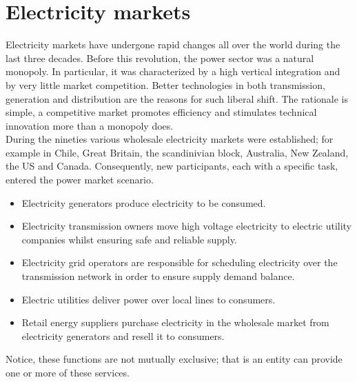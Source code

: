 \section{Electricity markets}
Electricity markets have undergone rapid changes all over the world during the last three decades.
Before this revolution, the power sector was a natural monopoly. In particular, it was characterized by a high vertical integration and by very little market competition. Better technologies in both transmission, generation and distribution are the reasons for such liberal shift. The rationale is simple, a competitive market promotes efficiency and stimulates technical innovation more than a monopoly does.
\\
During the nineties various wholesale electricity markets were established; for example in Chile, Great Britain, the scandinivian block, Australia, New Zealand, the US and Canada. Consequently, new participants, each with a specific task, entered the power market scenario.
\begin{itemize}
    \item Electricity generators produce electricity to be consumed.
    \item Electricity transmission owners 
    move high voltage electricity to electric utility companies whilst ensuring safe and reliable supply.
    \item Electricity grid operators are responsible for scheduling electricity over the transmission network in order to ensure supply demand balance.
    \item Electric utilities deliver power over local lines to consumers. 
    \item Retail energy suppliers purchase electricity in the wholesale market from electricity generators and resell it to consumers.
\end{itemize}
Notice, these functions are not mutually exclusive; that is an entity can provide one or more of these services.


